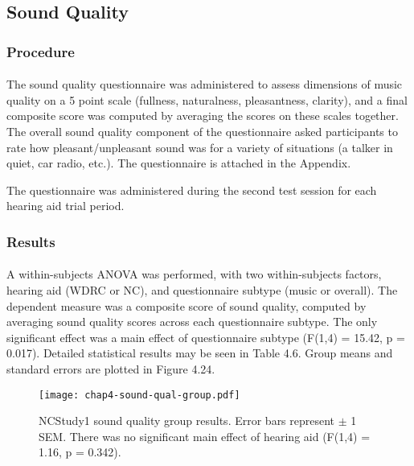 \subsection{Sound Quality}
\subsubsection{Procedure}
\paragraph{}The sound quality questionnaire was administered to assess dimensions of music quality on a 5 point scale (fullness, naturalness, pleasantness, clarity), and a final composite score was computed by averaging the scores on these scales together.  The overall sound quality component of the questionnaire asked participants to rate how pleasant/unpleasant sound was for a variety of situations (a talker in quiet, car radio, etc.).  The questionnaire is attached in the Appendix.

The questionnaire was administered during the second test session for each hearing aid trial period.

\subsubsection{Results}
\paragraph{}A within-subjects ANOVA was performed, with two within-subjects factors, hearing aid (WDRC or NC), and questionnaire subtype (music or overall).  The dependent measure was a composite score of sound quality, computed by averaging sound quality scores across each questionnaire subtype.  The only significant effect was a main effect of questionnaire subtype (F(1,4) = 15.42, p = 0.017).  Detailed statistical results may be seen in Table 4.6.  Group means and standard errors are plotted in Figure 4.24.

\begin{figure}[htp]
\begin{center}
\texttt{[image: chap4-sound-qual-group.pdf]} \\
\caption[NCStudy1 sound quality group results]{NCStudy1 sound quality group results.  Error bars represent $\pm$ 1 SEM.  There was no significant main effect of hearing aid (F(1,4) = 1.16, p = 0.342).}
\label{ch4-sound-qual-group}
\end{center}
\end{figure}

